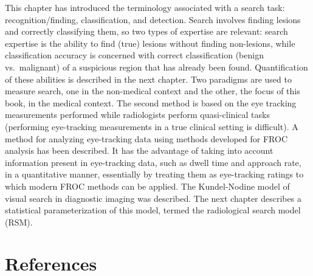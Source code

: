 \documentclass[
]{book}
\begin{document}
This chapter has introduced the terminology associated with a search task: recognition/finding, classification, and detection. Search involves finding lesions and correctly classifying them, so two types of expertise are relevant: search expertise is the ability to find (true) lesions without finding non-lesions, while classification accuracy is concerned with correct classification (benign vs.~malignant) of a suspicious region that has already been found. Quantification of these abilities is described in the next chapter. Two paradigms are used to measure search, one in the non-medical context and the other, the focus of this book, in the medical context. The second method is based on the eye tracking measurements performed while radiologists perform quasi-clinical tasks (performing eye-tracking measurements in a true clinical setting is difficult). A method for analyzing eye-tracking data using methods developed for FROC analysis has been described. It has the advantage of taking into account information present in eye-tracking data, such as dwell time and approach rate, in a quantitative manner, essentially by treating them as eye-tracking ratings to which modern FROC methods can be applied. The Kundel-Nodine model of visual search in diagnostic imaging was described. The next chapter describes a statistical parameterization of this model, termed the radiological search model (RSM).

\hypertarget{visual-search-references}{%
\section{References}\label{visual-search-references}}
\end{document}
